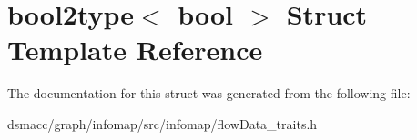 \hypertarget{structbool2type}{}\section{bool2type$<$ bool $>$ Struct Template Reference}
\label{structbool2type}


The documentation for this struct was generated from the following file\+:\begin{DoxyCompactItemize}
\item 
dsmacc/graph/infomap/src/infomap/flow\+Data\+\_\+traits.\+h\end{DoxyCompactItemize}
